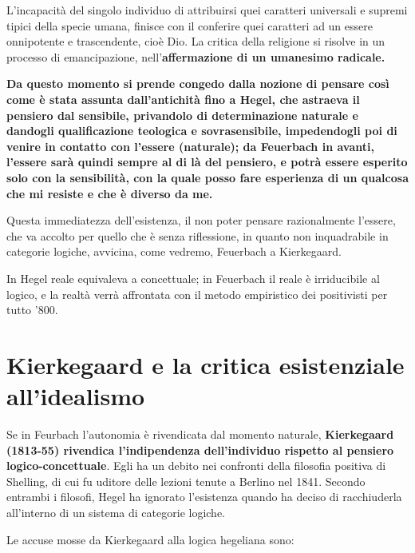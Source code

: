 L'incapacità del singolo individuo di attribuirsi quei caratteri universali e supremi tipici della specie umana, finisce con il conferire quei caratteri ad un essere onnipotente e trascendente, cioè Dio. La critica della religione si risolve in un processo di emancipazione, nell'\textbf{affermazione di un umanesimo radicale.}

\textbf{Da questo momento si prende congedo dalla nozione di pensare così come è stata assunta dall'antichità fino a Hegel, che astraeva il pensiero dal sensibile, privandolo di determinazione naturale e dandogli qualificazione teologica e sovrasensibile, impedendogli poi di venire in contatto con l'essere (naturale); da Feuerbach in avanti, l'essere sarà quindi sempre al di là del pensiero, e potrà essere esperito solo con la sensibilità, con la quale posso fare esperienza di un qualcosa che mi resiste e che è diverso da me.}

Questa immediatezza dell'esistenza, il non poter pensare razionalmente l'essere, che va accolto per quello che è senza riflessione, in quanto non inquadrabile in categorie logiche, avvicina, come vedremo, Feuerbach a Kierkegaard.

In Hegel reale equivaleva a concettuale; in Feuerbach il reale è irriducibile al logico, e la realtà verrà affrontata con il metodo empiristico dei positivisti per tutto '800.

\section{Kierkegaard e la critica esistenziale all'idealismo}

Se in Feurbach l'autonomia è rivendicata dal momento naturale, \textbf{Kierkegaard (1813-55) rivendica l'indipendenza dell'individuo rispetto al pensiero logico-concettuale}. Egli ha un debito nei confronti della filosofia positiva di Shelling, di cui fu uditore delle lezioni tenute a Berlino nel 1841. Secondo entrambi i filosofi, Hegel ha ignorato l'esistenza quando ha deciso di racchiuderla all'interno di un sistema di categorie logiche.

Le accuse mosse da Kierkegaard alla logica hegeliana sono:


